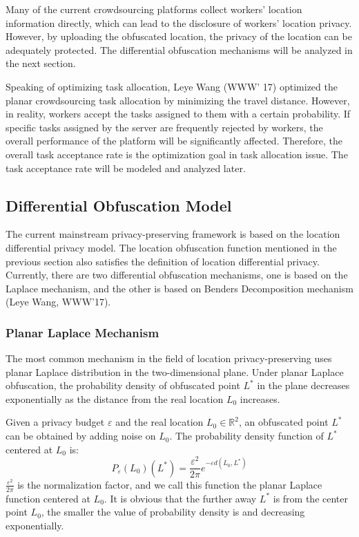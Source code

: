 Many of the current crowdsourcing platforms collect workers' location information directly, which can lead to the disclosure of workers' location privacy. However, by uploading the obfuscated location, the privacy of the location can be adequately protected. The differential obfuscation mechanisms will be analyzed in the next section.

Speaking of optimizing task allocation, Leye Wang (WWW' 17) optimized the planar crowdsourcing task allocation by minimizing the travel distance. However, in reality, workers accept the tasks assigned to them with a certain probability. If specific tasks assigned by the server are frequently rejected by workers, the overall performance of the platform will be significantly affected. Therefore, the overall task acceptance rate is the optimization goal in task allocation issue. The task acceptance rate will be modeled and analyzed later.

\subsection{Differential Obfuscation Model}
The current mainstream privacy-preserving framework is based on the location differential privacy model. The location obfuscation function mentioned in the previous section also satisfies the definition of location differential privacy. Currently, there are two differential obfuscation mechanisms, one is based on the Laplace mechanism, and the other is based on Benders Decomposition mechanism (Leye Wang, WWW'17).

\subsubsection{Planar Laplace Mechanism}
The most common mechanism in the field of location privacy-preserving uses planar Laplace distribution in the two-dimensional plane. Under planar Laplace obfuscation, the probability density of obfuscated point $L^*$ in the plane decreases exponentially as the distance from the real location $L_0$ increases. 

Given a privacy budget $\varepsilon$ and the real location $L_0 \in \mathbb R^2$, an obfuscated point $L^*$ can be obtained by adding noise on $L_0$. The probability density function of $L^*$ centered at $L_0$ is:
$$
	P_\varepsilon (L_0)(L^*)=\frac{\varepsilon^2}{2\pi} e^{-\varepsilon d(L_0,L^*)}
$$
$\frac{\varepsilon^2}{2\pi}$ is the normalization factor, and we call this function the planar Laplace function centered at $L_0$. It is obvious that the further away $L^*$ is from the center point $L_0$, the smaller the value of probability density is and decreasing exponentially.

